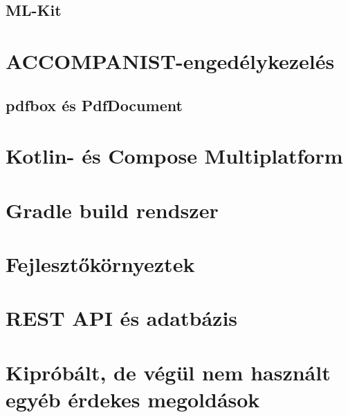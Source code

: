 \subsection{ML-Kit}

\section{ACCOMPANIST-engedélykezelés}

\subsection{pdfbox és PdfDocument}

\section{Kotlin- és Compose Multiplatform}

\section{Gradle build rendszer}

\section{Fejlesztőkörnyeztek}

\section{REST API és adatbázis}

\section{Kipróbált, de végül nem használt egyéb érdekes megoldások}